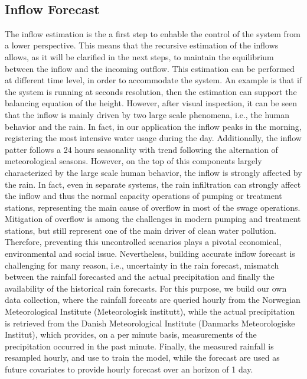 \


\subsection{Inflow Forecast}
The inflow estimation is the a first step to enhable the control of the system from a lower
perspective. This means that the recursive estimation of the inflows allows, as it will be clarified in the next 
steps, to maintain the equilibrium between the inflow and the incoming outflow. This estimation can be performed 
at different time level, in order to accommodate the system. An example is that if the system is running at 
seconds resolution, then the estimation can support the balancing equation of the height. However, after visual 
inspection, it can be seen that the inflow is mainly driven by two large scale phenomena, i.e., the human 
behavior and the rain. In fact, in our application the inflow peaks in the morning, registering the 
most intensive water usage during the day. Additionally, the inflow patter follows a 24 hours seasonality with trend 
following the alternation of meteorological seasons. However, on the top of this components largely characterized by the 
large scale human behavior, the inflow is strongly affected by the rain. In fact, even in separate systems, the rain 
infiltration can strongly affect the inflow and thus the normal capacity operations of pumping or treatment stations, representing the main cause of 
overflow in most of the swage operations. Mitigation of overflow is among the challenges in modern pumping and treatment stations, but still represent 
one of the main driver of clean water pollution. Therefore, preventing this uncontrolled scenarios plays a pivotal economical, environmental and social issue. 
Nevertheless, building accurate inflow forecast is challenging for many reason, i.e., uncertainty in the rain forecast, mismatch between the 
rainfall forecasted and the actual precipitation and finally the availability of the historical rain forecasts. 
For this purpose, we build our own data collection, where the rainfall forecats are queried hourly from the Norwegian Meteorological Institute (Meteorologisk institutt), while the 
actual precipitation is retrieved from the Danish Meteorological Institute (Danmarks Meteorologiske Institut), which provides, on a per minute basis,  measurements of 
the precipitation occurred in the past minute. Finally, the measured rainfall is resampled hourly, and use to train the model, while the forecast 
are used as future covariates to provide hourly forecast over an horizon of 1 day.




